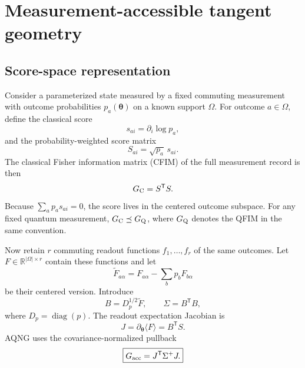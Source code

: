 \section{Measurement-accessible tangent geometry}

\subsection{Score-space representation}
Consider a parameterized state measured by a fixed commuting measurement with outcome probabilities $p_a(\bm\theta)$ on a known support $\Omega$. For outcome $a\in\Omega$, define the classical score
\begin{equation}
 s_{ai}=\partial_i\log p_a,
\end{equation}
and the probability-weighted score matrix
\begin{equation}
 S_{ai}=\sqrt{p_a}\,s_{ai}.
\end{equation}
The classical Fisher information matrix (CFIM) of the full measurement record is then
\begin{equation}
 G_{\rm C}=S^{\mathsf T}S.
\end{equation}
Because $\sum_a p_a s_{ai}=0$, the score lives in the centered outcome subspace. For any fixed quantum measurement, $G_{\rm C}\preceq G_{\rm Q}$, where $G_{\rm Q}$ denotes the QFIM in the same convention.

Now retain $r$ commuting readout functions $f_1,\ldots,f_r$ of the same outcomes. Let $F\in\mathbb R^{|\Omega|\times r}$ contain these functions and let
\begin{equation}
 \widetilde F_{a\alpha}=F_{a\alpha}-\sum_b p_bF_{b\alpha}
\end{equation}
be their centered version. Introduce
\begin{equation}
 B=D_p^{1/2}\widetilde F,
 \qquad
 \Sigma=B^{\mathsf T}B,
\end{equation}
where $D_p=\operatorname{diag}(p)$. The readout expectation Jacobian is
\begin{equation}
 J=\partial_{\bm\theta}\langle F\rangle
   =B^{\mathsf T}S.
\end{equation}
AQNG uses the covariance-normalized pullback
\begin{equation}
 \boxed{G_{\mathrm{acc}}=J^{\mathsf T}\Sigma^{+}J.}
 \label{eq:gacc}
\end{equation}

